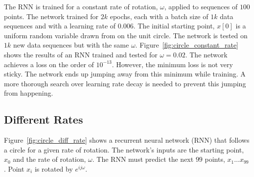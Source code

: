 The RNN is trained for a constant rate of rotation, $\omega$, applied to sequences of $100$ points.  The network trained for $2k$ epochs, each with a batch size of $1k$ data sequences and with a learning rate of $0.006$.  The initial starting point, $x[0]$ is a uniform random variable drawn from on the unit circle. 
The network is tested on $1k$ new data sequences but with the same $\omega$.
Figure~\ref{fig:circle_constant_rate} shows the results of an RNN trained and tested for $\omega=0.02$.  
The network achieves a loss on the order of $10^{-13}$.  However, the minimum loss is not very sticky.  The network ends up jumping away from this minimum while training.  A more thorough search over learning rate decay is needed to prevent this jumping from happening.

\subsection{Different Rates}


Figure~\ref{fig:circle_diff_rate} shows a recurrent neural network (RNN) that follows a circle for a given rate of rotation.
The network's inputs are the starting point, $x_0$ and the rate of rotation, $\omega$.
The RNN must predict the next $99$ points, $x_1 \ldots x_{99}$.  Point $x_i$ is rotated by $e^{ij\omega}$.

